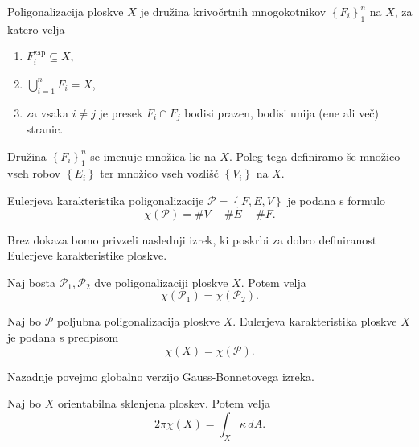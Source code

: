 \begin{definicija}
\label{def_poligonalizacija_ploskve}
Poligonalizacija ploskve $X$ je družina krivočrtnih mnogokotnikov $\left\{ F_i\right\}_1^{n}$ na $X$, za katero velja \begin{enumerate}
    \item  $F_i^{\text{zap}} \subseteq  X$,
    \item $\bigcup_{i = 1}^{n} F_i = X$,
    \item za vsaka $i \neq j$ je presek $F_i \cap  F_j$ bodisi prazen, bodisi unija (ene ali več) stranic. 
\end{enumerate}
Družina $\left\{ F_i\right\}_1^{n}$ se imenuje množica lic na $X$. Poleg tega definiramo še množico vseh robov $\left\{ E_i\right\}$ ter množico vseh vozlišč $\left\{ V_i\right\}$ na $X$.
\end{definicija}

\begin{definicija}
\label{def_Eulerjeva_karakteristika}
Eulerjeva karakteristika poligonalizacije $\mathcal{P} = \left\{ F, E, V\right\}$ je podana s formulo \begin{equation*}
\chi(\mathcal{P}) =  \#V -  \#E + \#F.
\end{equation*}  
\end{definicija}

Brez dokaza bomo privzeli naslednji izrek, ki poskrbi za dobro definiranost Eulerjeve karakteristike ploskve.
\begin{izrek}
\label{izr_dobra_definiranost_Eulerjeve_karkteristike}
 Naj bosta $\mathcal{P}_1, \mathcal{P}_2$ dve poligonalizaciji ploskve $X$. Potem velja \begin{equation*}
 \chi(\mathcal{P}_1) = \chi(\mathcal{P}_2).
\end{equation*}  
\end{izrek}

\begin{definicija}
\label{def_Eulerjeva_karkteristika}
Naj bo $\mathcal{P}$ poljubna poligonalizacija ploskve $X$. Eulerjeva karakteristika ploskve $X$ je podana s predpisom \begin{equation*}
\chi(X) = \chi(\mathcal{P}).
\end{equation*}  
   
\end{definicija}

Nazadnje povejmo globalno verzijo Gauss-Bonnetovega izreka.

\begin{izrek}
\label{izr_globalni_GB}
Naj bo $X$ orientabilna sklenjena ploskev. Potem velja \begin{equation*}
2 \pi \chi(X) = \int_{X} \kappa \, dA.
\end{equation*}  
\end{izrek}

